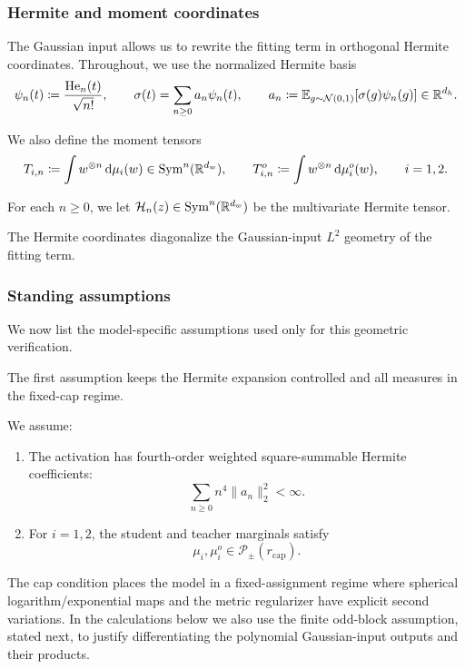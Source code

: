 \subsubsection{Hermite and moment coordinates}

The Gaussian input allows us to rewrite the fitting term in orthogonal Hermite coordinates.
Throughout, we use the normalized Hermite basis
\begin{equation}
    \psi_n(t) \coloneq \frac{\mathrm{He}_n(t)}{\sqrt{n!}},
    \qquad
    \sigma(t) = \sum_{n\ge 0} a_n\psi_n(t),
    \qquad
    a_n \coloneq \mathbb{E}_{g\sim \mathcal N(0,1)}[\sigma(g)\psi_n(g)] \in \mathbb{R}^{d_h}.
\end{equation}

We also define the moment tensors
\begin{equation}
    T_{i,n} \coloneq \int w^{\otimes n}\,\dd\mu_i(w) \in \mathrm{Sym}^n(\mathbb{R}^{d_w}),
    \qquad
    T_{i,n}^o \coloneq \int w^{\otimes n}\,\dd\mu_i^o(w),
    \qquad i=1,2.
\end{equation}

For each $n\ge 0$, we let $\mathcal{H}_n(z)\in \mathrm{Sym}^n(\mathbb{R}^{d_w})$ be the multivariate Hermite tensor.

The Hermite coordinates diagonalize the Gaussian-input \(L^2\) geometry of the fitting term.

\subsubsection{Standing assumptions}
\label{subsubsection:spherical-model-assumptions}

We now list the model-specific assumptions used only for this geometric verification.

The first assumption keeps the Hermite expansion controlled and all measures in the fixed-cap regime. 
\begin{assumption}
\label{assumption:on-sphere}
We assume:
\begin{enumerate}
    \item The activation has fourth-order weighted square-summable Hermite coefficients:
    \[
        \sum_{n\ge0} n^4\|a_n\|_2^2<\infty.
    \]
    \item For \(i=1,2\), the student and teacher marginals satisfy
    \[
        \mu_i,\mu_i^o\in\mathcal P_\pm(r_{\mathrm{cap}}).
    \]
\end{enumerate}
\end{assumption}
The cap condition places the model in a fixed-assignment regime where
spherical logarithm/exponential maps and the metric regularizer have
explicit second variations.  In the calculations below we also use the
finite odd-block assumption, stated next, to justify differentiating the
polynomial Gaussian-input outputs and their products.

